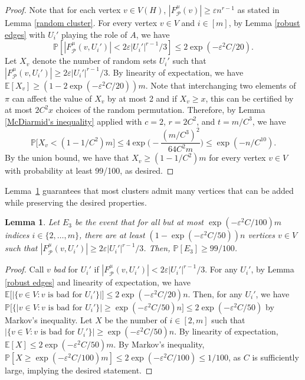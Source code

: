 \documentclass[11pt, letterpaper]{amsart}
\theoremstyle{plain}
\numberwithin{equation}{section}
\newtheorem{lemma}[thm]{Lemma}
\theoremstyle{definition}
\newcommand\card[1]{\left| #1 \right|}
\begin{document}
\begin{proof}
Note that for each vertex $ v\in V(H) $, $ |F^{\mu}_{\mathcal{P}}(v)|\ge \varepsilon{n}^{r-1} $  as stated in Lemma \ref{random cluster}. 
For every vertex $v\in V$ and $i\in[m]$, by Lemma \ref{robust edges} with $U_i'$ playing the role of $A$, we have
\begin{equation}
\label{eq:FPvU}
\mathbb{P}\left[|F^{\mu}_{\mathcal{P}}(v,U_i')|<2\varepsilon{\card{U_i'}}^{r-1}/3\right]\le 2\exp{\left(-\varepsilon^2 C/20\right)}.
\end{equation}
Let $X_v$ denote the number of random sets $U_i'$ such that $|F^{\mu}_{\mathcal{P}}(v,U_i')|\ge {2\varepsilon}{\card{U_i'}}^{r-1}/3$. 
By linearity of expectation, we have $\mathbb{E}[X_v]\ge \left(1-2\exp{\left(-\varepsilon^2 C/20\right)}\right)m.$ 
        Note that interchanging two elements of $\pi$ can affect the value of $X_v$ by at most 2 and if $X_v\ge x$, this can be certified by at most $2C^2x$ choices of the random permutation. 
        Therefore, by Lemma \ref{McDiarmid's inequality} applied with $c=2$, $r=2C^2$, and $t=m/C^3$, we have
\[\mathbb{P}\big[X_v<(1-1/C^2)m\big]\le 4\exp{\Big(-\frac{{(m/C^3)}^2}{64C^2m}\Big)}\le \exp{(-n/C^{10})}.\]
By the union bound, we have that $X_v\ge (1-1/C^2)m$ for every vertex $v\in V$ with probability at least 99/100, as desired.
\end{proof}
    
Lemma~\ref{robust edge of random cluster d(i)} guarantees that most clusters admit many vertices that can be added while preserving the desired properties.

\begin{lemma}\label{robust edge of random cluster d(i)}
Let $E_3$ be the event that for all but at most $\exp{\left(-\varepsilon^2 C/100\right)}m$ indices $i\in\{2,\dots,m\}$, there are at least $\left(1-\exp{\left(-\varepsilon^2 C/50\right)}\right)n$ vertices $v\in V$ such that $|F^{\mu}_{\mathcal{P}}(v,U_i')|\ge 2\varepsilon{\card{U_i'}}^{r-1}/3$. 
Then, $\mathbb{P}\left[E_3\right]\ge 99/100$.
\end{lemma}
\begin{proof}
Call $v$ \emph{bad} for $U_i'$ if $|F^{\mu}_{\mathcal{P}}(v,U_i')|<2\varepsilon{\card{U_i'}}^{r-1}/3$. 
For any $U_i'$, by Lemma \ref{robust edges} and linearity of expectation, we have $\mathbb{E}\big[|\{v\in V: v\text{ is bad for }U_i'\}|\big]\le 2\exp{\left(-\varepsilon^2 C/20\right)}n$. 
Then, for any $U_i'$, we have $\mathbb{P}\big[\{|v\in V: v\text{ is bad for }U_i'\}|\ge \exp{\left(-\varepsilon^2 C/50\right)}n\big]\le 2\exp{\left(-\varepsilon^2 C/50\right)}$ by Markov's inequality. 
Let $X$ be the number of $i\in [2,m]$ such that $|\{v\in V: v\text{ is bad for }U_i'\}|\ge \exp{\left(-\varepsilon^2 C/50\right)}n$. 
        By linearity of expectation, $\mathbb{E}[X]\le 2\exp{\left(-\varepsilon^2 C/50\right)}m$. 
        By Markov's inequality, $\mathbb{P}[X\ge\exp{\left(-\varepsilon^2 C/100\right)}m]\le 2\exp{\left(-\varepsilon^2 C/100\right)}\le 1/100$, as $C$ is sufficiently large, implying the desired statement.
    \end{proof}
 
\end{document}

